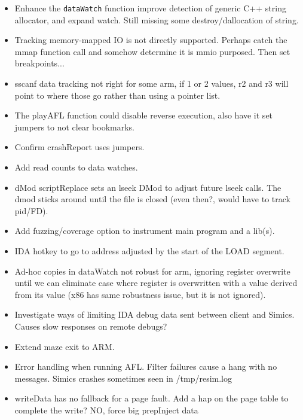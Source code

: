 \documentclass[titlepage]{article}
\begin{document}
\begin{appendices}
\begin{itemize}
\item Enhance the {\tt dataWatch} function improve detection of generic C++ string allocator, and expand watch.  Still missing some destroy/dallocation
of string.

\item Tracking memory-mapped IO is not directly supported.  Perhaps catch the mmap function call and somehow determine it is mmio purposed.  Then
set breakpoints...

\item sscanf data tracking not right for some arm, if 1 or 2 values, r2 and r3 will point to where those go rather than using a pointer list.

\item The playAFL function could disable reverse execution, also have it set jumpers to not clear bookmarks.

\item Confirm crashReport uses jumpers.

\item Add read counts to data watches.

\item dMod scriptReplace sets an lseek DMod to adjust future lseek calls.  The dmod sticks around until the file is closed (even then?, would 
have to track pid/FD).

\item Add fuzzing/coverage option to instrument main program and a lib(s).

\item IDA hotkey to go to address adjusted by the start of the LOAD segment.

\item Ad-hoc copies in dataWatch not robust for arm, ignoring register overwrite until we can eliminate case where register is overwritten
with a value derived from its value (x86 has same robustness issue, but it is not ignored).

\item Investigate ways of limiting IDA debug data sent between client and Simics.  Causes slow responses on remote debugs?

\item Extend maze exit to ARM.

\item Error handling when running AFL.  Filter failures cause a hang with no messages.  Simics crashes sometimes seen in /tmp/resim.log

\item writeData has no fallback for a page fault.  Add a hap on the page table to complete the write?  NO, force big prepInject data


\end{itemize}
\end{appendices}
\end{document}

